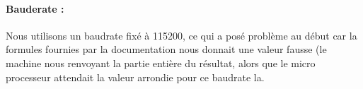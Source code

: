 \paragraph{Bauderate :}
Nous utilisons un baudrate fixé à 115200, ce qui a posé problème au
début car la formules fournies par la documentation nous donnait une
valeur fausse (le machine nous renvoyant la partie entière du
résultat, alors que le micro processeur attendait la valeur arrondie
pour ce baudrate la.

\paragraph{}
